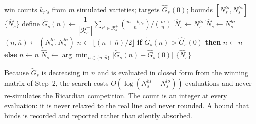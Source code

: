 \begin{algorithm}[H]
\caption{\textsc{CalibrateN}: variety count by monotone integer search}
\label{alg:countN}
\begin{algorithmic}[1]
\Require win counts $k_{r's}$ from $m$ simulated varieties; targets
  $\widehat{G}_s(0)$; bounds $[N^{lo}_s,N^{hi}_s]$
\Ensure $\{\widehat{N}_s\}$
    \State define
      $\widetilde{G}_s(n)\gets\dfrac{1}{|\mathcal{R}^+_s|}\displaystyle\sum_{r'\in\mathcal{R}^+_s}
      \binom{m-k_{r's}}{n}\Big/\binom{m}{n}$
        \State $\widehat{N}_s\gets N^{lo}_s$ 
        \State $\widehat{N}_s\gets N^{hi}_s$ 
    \Else
        \State $(\underline{n},\overline{n})\gets(N^{lo}_s,N^{hi}_s)$
            \State $n\gets\lfloor(\underline{n}+\overline{n})/2\rfloor$
            \State \textbf{if} $\widetilde{G}_s(n)>\widehat{G}_s(0)$ \textbf{then}
              $\underline{n}\gets n$ \textbf{else} $\overline{n}\gets n$
        \EndWhile
        \State $\widehat{N}_s\gets\arg\min_{n\in\{\underline{n},\overline{n}\}}
          \bigl|\widetilde{G}_s(n)-\widehat{G}_s(0)\bigr|$
    \EndIf
\EndFor
\State \Return $\{\widehat{N}_s\}$
\end{algorithmic}
\end{algorithm}

Because $\widetilde{G}_s$ is decreasing in $n$ and is evaluated in closed form
from the winning matrix of Step~2, the search costs $O(\log(N^{hi}_s-N^{lo}_s))$
evaluations and never re-simulates the Ricardian competition. The count is an
integer at every evaluation: it is never relaxed to the real line and never
rounded. A bound that binds is recorded and reported rather than silently
absorbed.


